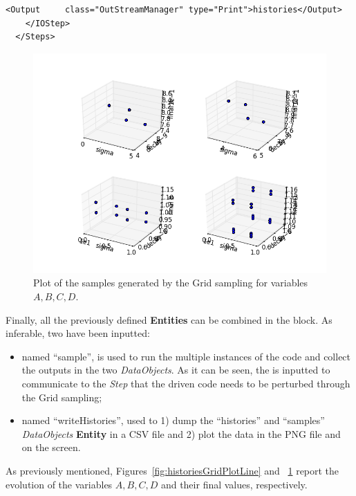 \begin{enumerate}
\begin{lstlisting}[style=XML,morekeywords={arg,extension,pauseAtEnd,overwrite}]
        <Output 	class="OutStreamManager" type="Print">histories</Output>
    </IOStep>
  </Steps>
\end{lstlisting}
 \begin{figure}[h!]
  \centering
  \includegraphics[scale=0.7]{pics/Grid_pointsets.png}
  \caption{Plot of the samples generated by the Grid sampling for variables $A,B,C,D$.}
  \label{fig:samplesGridPlotLine}
 \end{figure}
   Finally, all the previously defined \textbf{Entities} can be combined in 
   the  block. As inferable, 
   two  have been inputted:
   \begin{itemize}
     \item {} named ``sample'', is used to run the multiple  
     instances of the code and 
     collect the outputs in the two \textit{DataObjects}. As it can be
     seen, the  is inputted to communicate to the 
     \textit{Step} that the driven code needs to
     be perturbed through the Grid sampling;
     \item  {} named ``writeHistories'', used to 1) dump 
     the ``histories'' and ``samples'' \textit{DataObjects} 
     \textbf{Entity} in a CSV file and 2) plot the data in the PNG file and 
     on the screen.
   \end{itemize}
\end{enumerate} 
 As previously mentioned, Figures~\ref{fig:historiesGridPlotLine} and ~\ref{fig:samplesGridPlotLine}  report the evolution of the 
 variables $A,B,C,D$ and their final values, respectively.

